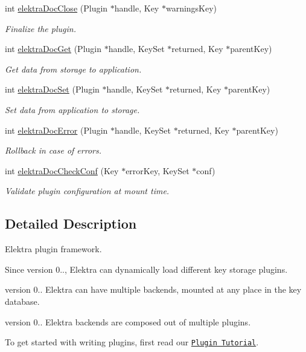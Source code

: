 \begin{DoxyCompactItemize}
int \hyperlink{group__plugin_ga1236aefe5b2baf8b7bf636ba5aa9ea29}{elektra\+Doc\+Close} (Plugin $\ast$handle, Key $\ast$warnings\+Key)
\begin{DoxyCompactList}\small\item\em Finalize the plugin. \end{DoxyCompactList}\item 
int \hyperlink{group__plugin_gacb69f3441c6d84241b4362f958fbe313}{elektra\+Doc\+Get} (Plugin $\ast$handle, Key\+Set $\ast$returned, Key $\ast$parent\+Key)
\begin{DoxyCompactList}\small\item\em Get data from storage to application. \end{DoxyCompactList}\item 
int \hyperlink{group__plugin_gae65781a1deb34efc79c8cb9d9174842c}{elektra\+Doc\+Set} (Plugin $\ast$handle, Key\+Set $\ast$returned, Key $\ast$parent\+Key)
\begin{DoxyCompactList}\small\item\em Set data from application to storage. \end{DoxyCompactList}\item 
int \hyperlink{group__plugin_gad74b35f558ac7c3262f6069c5c47dc79}{elektra\+Doc\+Error} (Plugin $\ast$handle, Key\+Set $\ast$returned, Key $\ast$parent\+Key)
\begin{DoxyCompactList}\small\item\em Rollback in case of errors. \end{DoxyCompactList}\item 
int \hyperlink{group__plugin_ga1c8702efe0f3853c2d7ecca0889f78e8}{elektra\+Doc\+Check\+Conf} (Key $\ast$error\+Key, Key\+Set $\ast$conf)
\begin{DoxyCompactList}\small\item\em Validate plugin configuration at mount time. \end{DoxyCompactList}\end{DoxyCompactItemize}


\subsection{Detailed Description}
Elektra plugin framework. 

\begin{DoxySince}{Since}
version 0.., Elektra can dynamically load different key storage plugins.

version 0.. Elektra can have multiple backends, mounted at any place in the key database.

version 0.. Elektra backends are composed out of multiple plugins.
\end{DoxySince}
To get started with writing plugins, first read our \href{doc_tutorials_plugins_md.html}{\tt Plugin Tutorial}.

